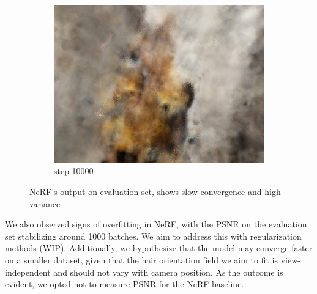\documentclass[12pt]{article}
\begin{document}
\begin{figure}[h]
\begin{subfigure}{0.3\textwidth}
            \centering
            \includegraphics[width=\textwidth]{./images/nerf_pred/nerf_10000.png}
            \caption{step 10000}
        \end{subfigure}
        
      \caption{NeRF's output on evaluation set, shows slow convergence and high variance}
      \label{fig:nerf_slow}
  \end{figure}

  We also observed signs of overfitting in NeRF, with the PSNR on the evaluation set stabilizing around 1000 batches. We aim to address this with regularization methods (WIP). Additionally, we hypothesize that the model may converge faster on a smaller dataset, given that the hair orientation field we aim to fit is view-independent and should not vary with camera position. As the outcome is evident, we opted not to measure PSNR for the NeRF baseline.

\end{document}
